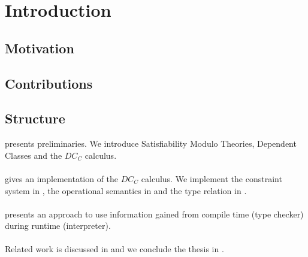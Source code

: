 \chapter{Introduction}
\section{Motivation}
\section{Contributions}

\section{Structure}
 presents preliminaries.
We introduce Satisfiability Modulo Theories,
Dependent Classes and the $DC_C$ calculus.\\
\\
 gives an implementation of the $DC_C$ calculus.
We implement
the constraint system in ,
the operational semantics in  and
the type relation in .\\
\\
 presents an approach
to use information gained from compile time (type checker)
during runtime (interpreter).\\
\\
Related work is discussed in 
and we conclude the thesis in .


